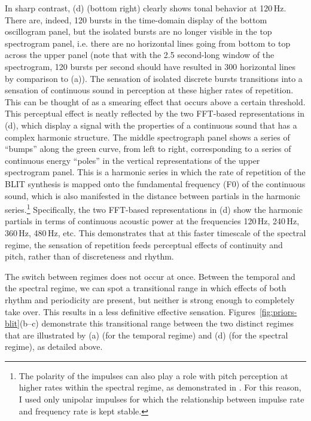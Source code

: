 In sharp contrast, (d) (bottom right) clearly shows tonal behavior at 120\,Hz. There are, indeed, 120 bursts in the time-domain display of the bottom oscillogram panel, but the isolated bursts are no longer visible in the top spectrogram panel, i.e. there are no horizontal lines going from bottom to top across the upper panel (note that with the 2.5 second-long window of the spectrogram, 120 bursts per second should have resulted in 300 horizontal lines by comparison to (a)).
The sensation of isolated discrete bursts transitions into a sensation of continuous sound in perception at these higher rates of repetition. This can be thought of as a smearing effect that occurs above a certain threshold. This perceptual effect is neatly reflected by the two FFT-based representations in (d), which display a signal with the properties of a continuous sound that has a complex harmonic structure. The middle spectrograph panel shows a series of \enquote{bumps} along the green curve, from left to right, corresponding to a series of continuous energy \enquote{poles} in the vertical representations of the upper spectrogram panel. This is a harmonic series in which the rate of repetition of the BLIT synthesis is mapped onto the fundamental frequency (F0) of the continuous sound, which is also manifested in the distance between partials in the harmonic series.\footnote{The polarity of the impulses can also play a role with pitch perception at higher rates within the spectral regime, as demonstrated in \citet{flanagan1960pitch}. For this reason, I used only unipolar impulses for which the relationship between impulse rate and frequency rate is kept stable.} Specifically, the two FFT-based representations in (d) show the harmonic partials in terms of continuous acoustic power at the frequencies 120\,Hz, 240\,Hz, 360\,Hz, 480\,Hz, etc.
This demonstrates that at this faster timescale of the spectral regime, the sensation of repetition feeds perceptual effects of continuity and pitch, rather than of discreteness and rhythm.

The switch between regimes does not occur at once. Between the temporal and the spectral regime, we can spot a transitional range in which effects of both rhythm and periodicity are present, but neither is strong enough to completely take over. This results in a less definitive effective sensation.
Figures~\ref{fig:priors-blit}(b--c) demonstrate this transitional range between the two distinct regimes that are illustrated by (a) (for the temporal regime) and (d) (for the spectral regime), as detailed above.


